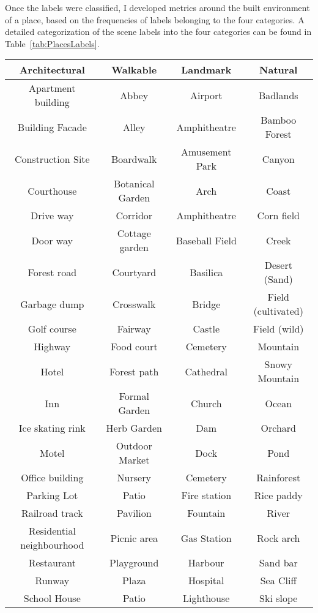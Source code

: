Once the labels were classified, I developed metrics around the built environment of a place, based on the frequencies of labels belonging to the four categories. 
A detailed categorization of the scene labels into the four categories can be found in Table~\ref{tab:PlacesLabels}.
\begin{table}[htb!]
    \centering
    \begin{tabular}{ |c|c|c|c| }
        \hline
        \textbf{Architectural} & \textbf{Walkable} & \textbf{Landmark} & \textbf{Natural} \\
        \hline
        Apartment building & Abbey & Airport & Badlands\\
        Building Facade & Alley & Amphitheatre & Bamboo Forest\\
        Construction Site & Boardwalk & Amusement Park & Canyon \\
        Courthouse & Botanical Garden & Arch & Coast \\
        Drive way & Corridor & Amphitheatre & Corn field \\
        Door way & Cottage garden & Baseball Field & Creek \\
        Forest road & Courtyard & Basilica & Desert (Sand) \\
        Garbage dump & Crosswalk & Bridge & Field (cultivated)\\
        Golf course & Fairway & Castle & Field (wild)\\
        Highway & Food court & Cemetery & Mountain \\
        Hotel & Forest path & Cathedral & Snowy Mountain \\
        Inn & Formal Garden & Church & Ocean \\
        Ice skating rink & Herb Garden & Dam & Orchard \\
        Motel & Outdoor Market & Dock & Pond \\
        Office building & Nursery & Cemetery & Rainforest \\
        Parking Lot & Patio & Fire station & Rice paddy \\
        Railroad track & Pavilion & Fountain & River \\
        Residential neighbourhood & Picnic area & Gas Station & Rock arch\\
        Restaurant & Playground & Harbour & Sand bar \\
        Runway & Plaza & Hospital & Sea Cliff\\
        School House & Patio & Lighthouse & Ski slope \\

\end{tabular}
\end{table}
